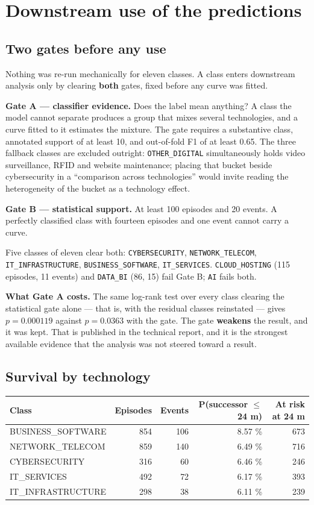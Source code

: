 \section{Downstream use of the predictions}

\subsection{Two gates before any use}

Nothing was re-run mechanically for eleven classes. A class enters downstream analysis only by clearing \textbf{both} gates, fixed before any curve was fitted.

\textbf{Gate A --- classifier evidence.} Does the label mean anything? A class the model cannot separate produces a group that mixes several technologies, and a curve fitted to it estimates the mixture. The gate requires a substantive class, annotated support of at least 10, and out-of-fold F1 of at least 0.65. The three fallback classes are excluded outright: \texttt{OTHER\_DIGITAL} simultaneously holds video surveillance, RFID and website maintenance; placing that bucket beside cybersecurity in a ``comparison across technologies'' would invite reading the heterogeneity of the bucket as a technology effect.

\textbf{Gate B --- statistical support.} At least 100 episodes and 20 events. A perfectly classified class with fourteen episodes and one event cannot carry a curve.

Five classes of eleven clear both: \texttt{CYBERSECURITY}, \texttt{NETWORK\_TELECOM}, \texttt{IT\_INFRASTRUCTURE}, \texttt{BUSINESS\_SOFTWARE}, \texttt{IT\_SERVICES}. \texttt{CLOUD\_HOSTING} (115 episodes, 11 events) and \texttt{DATA\_BI} (86, 15) fail Gate B; \texttt{AI} fails both.

\textbf{What Gate A costs.} The same log-rank test over every class clearing the statistical gate alone --- that is, with the residual classes reinstated --- gives \(p = 0.000119\) against \(p = 0.0363\) with the gate. The gate \textbf{weakens} the result, and it was kept. That is published in the technical report, and it is the strongest available evidence that the analysis was not steered toward a result.

\subsection{Survival by technology}

\begingroup\footnotesize
\begin{longtable}[]{@{}lrrrr@{}}
\toprule\noalign{}
Class & Episodes & Events & P(successor $\le$ 24 m) & At risk at 24 m \\
\midrule\noalign{}
\endhead
\bottomrule\noalign{}
\endlastfoot
BUSINESS\_SOFTWARE & 854 & 106 & 8.57 \% & 673 \\
NETWORK\_TELECOM & 859 & 140 & 6.49 \% & 716 \\
CYBERSECURITY & 316 & 60 & 6.46 \% & 246 \\
IT\_SERVICES & 492 & 72 & 6.17 \% & 393 \\
IT\_INFRASTRUCTURE & 298 & 38 & 6.11 \% & 239 \\
\end{longtable}
\endgroup


